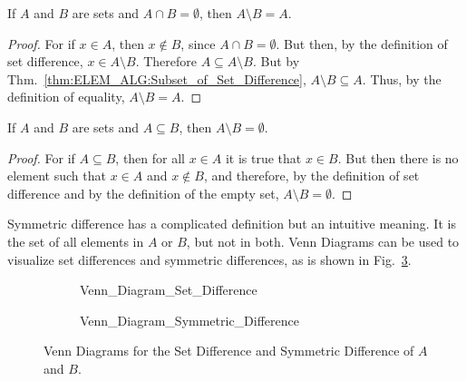 \documentclass[crop=false,class=book,oneside]{standalone}                      %
\begin{document}
            \begin{theorem}
                If $A$ and $B$ are sets and $A\cap{B}=\emptyset$,
                then $A\setminus{B}=A$.
            \end{theorem}
            \begin{proof}
                For if $x\in{A}$, then $x\notin{B}$,
                since $A\cap{B}=\emptyset$. But then, by the
                definition of set difference,
                $x\in{A}\setminus{B}$. Therefore
                $A\subseteq{A}\setminus{B}$. But by
                Thm.~\ref{thm:ELEM_ALG:Subset_of_Set_Difference},
                $A\setminus{B}\subseteq{A}$. Thus, by the
                definition of equality,
                $A\setminus{B}=A$.
            \end{proof}
            \begin{theorem}
                If $A$ and $B$ are sets and $A\subseteq{B}$,
                then $A\setminus{B}=\emptyset$.
            \end{theorem}
            \begin{proof}
                For if $A\subseteq{B}$, then for all
                $x\in{A}$ it is true that $x\in{B}$. But then
                there is no element such that
                $x\in{A}$ and $x\notin{B}$, and therefore, by
                the definition of set difference and by the
                definition of the empty set,
                $A\setminus{B}=\emptyset$.
            \end{proof}
            Symmetric difference has a complicated definition
            but an intuitive meaning. It is the set of all
            elements in $A$ or $B$, but not in both.
            Venn Diagrams can be used to visualize set
            differences and symmetric differences, as is shown in
            Fig.~\ref{fig:Elem_Alg_Venn_Diagram_Differences}.
            \begin{figure}[H]
                \captionsetup{type=figure}
                \centering
                \begin{subfigure}[b]{0.49\textwidth}
                    \captionsetup{type=figure}
                    \centering
                    {Venn_Diagram_Set_Difference}
                    \label{fig:Elem_Alg_Set_Difference}
                \end{subfigure}
                \begin{subfigure}[b]{0.49\textwidth}
                    \captionsetup{type=figure}
                    \centering
                    
                              {Venn_Diagram_Symmetric_Difference}
                    \label{fig:Elem_Alg_Symmetric_Differece}
                \end{subfigure}
                \caption[Venn Diagrams for Various Set Operations]
                        {Venn Diagrams for the Set Difference
                         and Symmetric Difference of $A$ and $B$.}
                \label{fig:Elem_Alg_Venn_Diagram_Differences}
            \end{figure}
\end{document}
